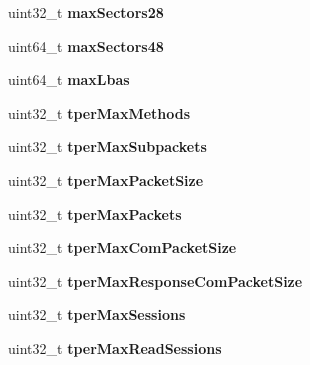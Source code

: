 \begin{DoxyCompactItemize}
\item 
\hypertarget{structsedContext_ae21a47e9f8443428f66062bf35450896}{}uint32\+\_\+t {\bfseries max\+Sectors28}\label{structsedContext_ae21a47e9f8443428f66062bf35450896}

\item 
\hypertarget{structsedContext_a7b2efd6bf2ae702e8d348d0ead8098d5}{}uint64\+\_\+t {\bfseries max\+Sectors48}\label{structsedContext_a7b2efd6bf2ae702e8d348d0ead8098d5}

\item 
\hypertarget{structsedContext_a7dd9de7b62676353a317d510f11ee1f7}{}uint64\+\_\+t {\bfseries max\+Lbas}\label{structsedContext_a7dd9de7b62676353a317d510f11ee1f7}

\item 
\hypertarget{structsedContext_a7e8de494937dbff10c870c47f8184e22}{}uint32\+\_\+t {\bfseries tper\+Max\+Methods}\label{structsedContext_a7e8de494937dbff10c870c47f8184e22}

\item 
\hypertarget{structsedContext_ab65335e75d54a7d2e5f63d6201667a41}{}uint32\+\_\+t {\bfseries tper\+Max\+Subpackets}\label{structsedContext_ab65335e75d54a7d2e5f63d6201667a41}

\item 
\hypertarget{structsedContext_a9dc8d7aa34e7ab4ce3d9d158e950eed4}{}uint32\+\_\+t {\bfseries tper\+Max\+Packet\+Size}\label{structsedContext_a9dc8d7aa34e7ab4ce3d9d158e950eed4}

\item 
\hypertarget{structsedContext_af258a385f026eeee38249dc32ad3ea75}{}uint32\+\_\+t {\bfseries tper\+Max\+Packets}\label{structsedContext_af258a385f026eeee38249dc32ad3ea75}

\item 
\hypertarget{structsedContext_a3449a268edfe0514df7c01499fb58e58}{}uint32\+\_\+t {\bfseries tper\+Max\+Com\+Packet\+Size}\label{structsedContext_a3449a268edfe0514df7c01499fb58e58}

\item 
\hypertarget{structsedContext_af5f11dd465b11c3b62494ac7bcfadc5d}{}uint32\+\_\+t {\bfseries tper\+Max\+Response\+Com\+Packet\+Size}\label{structsedContext_af5f11dd465b11c3b62494ac7bcfadc5d}

\item 
\hypertarget{structsedContext_a92daffaa9e121826ad0edf9e4334dee0}{}uint32\+\_\+t {\bfseries tper\+Max\+Sessions}\label{structsedContext_a92daffaa9e121826ad0edf9e4334dee0}

\item 
\hypertarget{structsedContext_a5f2d0245fea7b6f43e25f889d7b39bc8}{}uint32\+\_\+t {\bfseries tper\+Max\+Read\+Sessions}\label{structsedContext_a5f2d0245fea7b6f43e25f889d7b39bc8}


\end{DoxyCompactItemize}
